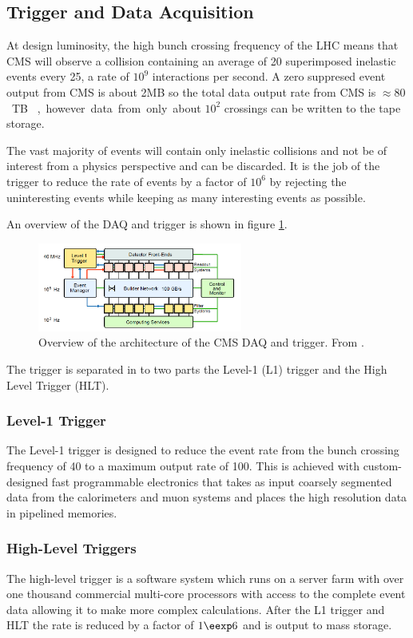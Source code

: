 \subsection{Trigger and Data Acquisition}
At design luminosity, the high bunch crossing frequency of the LHC means that
CMS will observe a collision containing an average of 20 superimposed inelastic
events every \unit{25}{\nano\second}, a rate of $10^{9}$ interactions per
second.
A zero suppresed event output from CMS is about \unit{2}{MB} so the total data
output rate from CMS is \unit{$\approx 80$}{TB \per \second},  however data from
only about $10^{2}$ crossings can be written to the tape storage. 

The vast majority of events will contain only inelastic collisions and not be of
interest from a physics perspective and can be discarded.  
It is the job of the trigger to reduce the rate of events
by a factor of $10^6$ by rejecting the uninteresting events while keeping as
many interesting events as possible.

An overview of the DAQ and trigger is shown in figure \ref{fig:CMSDAQ}.

\begin{figure}[htb!]
  \centering
  \includegraphics[width=0.6\textwidth]{CMSDAQ}
  \caption{Overview of the architecture of the CMS DAQ and trigger. From
  \label{fig:CMSDAQ}
\cite{cms}.}
\end{figure}

The trigger is separated in to two parts the Level-1 (L1) trigger and the High
Level Trigger (HLT).\cite{cms}

\subsubsection{Level-1 Trigger}
The Level-1 trigger is designed to reduce the event rate from the bunch
crossing frequency of \unit{40}{\mega\hertz} to a maximum output rate of
\unit{100}{\kilo\hertz}.
This is achieved with custom-designed fast programmable electronics that takes
as input coarsely segmented data from the calorimeters and muon systems and
places the high resolution data in pipelined memories.

\subsubsection{High-Level Triggers}
The high-level trigger is a software system which runs on a server farm with
over one thousand commercial multi-core processors with access to the complete
event data allowing it to make more complex calculations. After the L1 trigger
and HLT the rate is reduced by a factor of $1 \eexp 6$ and is output to mass
storage.\cite{cms}

